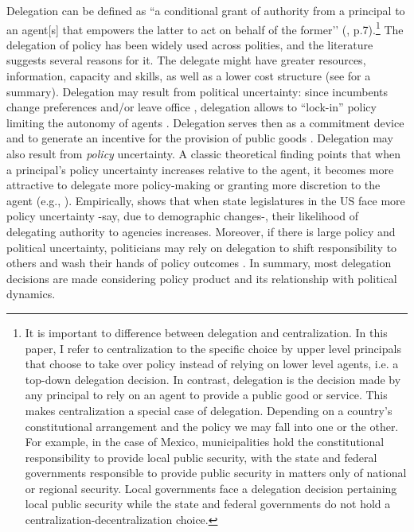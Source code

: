 \documentclass[12pt]{amsart}
\numberwithin{equation}{section}
\theoremstyle{definition}
\theoremstyle{definition}
\theoremstyle{definition}
\begin{document}

Delegation can be defined as ``a conditional grant of authority from a principal to an agent[s] that empowers the latter to act on behalf of the former’’ (\citet{Hawkins_etal_2006}, p.7).\footnote{It is important to difference between delegation and centralization. In this paper, I refer to centralization to the specific choice by upper level principals that choose to take over policy instead of relying on lower level agents, i.e. a top-down delegation decision. In contrast, delegation is the decision made by any principal to rely on an agent to provide a public good or service. This makes centralization a special case of delegation.  Depending on a country’s constitutional arrangement and the policy we may fall into one or the other. For example, in the case of Mexico, municipalities hold the constitutional responsibility to provide local public security, with the state and federal governments responsible to provide public security in matters only of national or regional security.  Local governments face a delegation decision pertaining local public security while the state and federal governments do not hold a centralization-decentralization choice.} The delegation of policy  has been widely used across polities, and the literature suggests several reasons for it. The delegate might have greater resources, information, capacity and skills, as well as a lower cost structure (see \citet{bolton_dewatripont_2005} for a summary). Delegation may result from political uncertainty: since incumbents change preferences and/or leave office \citep{moe_1989, shepsle_1992, horn_1995}, delegation  allows to ``lock-in'' policy limiting the autonomy of agents \citep{de_figueiredo_2002}.  Delegation serves then as a commitment device \citep{schelling_1960} and to generate an incentive for the provision of public goods \citep{aguion_tirole_1997}. Delegation may also result from \emph{policy} uncertainty. A classic theoretical finding points that when a principal's policy uncertainty increases relative to the agent, it becomes more attractive to delegate more policy-making or granting more discretion to the agent (e.g., \citet{epstein_halloran_1994, epstein_halloran_1999, bawn_1995}). Empirically, \citet{volden_2002} shows that when state legislatures in the US face more policy uncertainty -say, due to demographic changes-, their likelihood of delegating authority to agencies increases. Moreover, if there is large policy and political uncertainty, politicians may rely on delegation to shift responsibility to others and wash their hands of policy outcomes \citep{fiorina_1982, loftis_2014}. In summary, most delegation decisions are made considering policy product and its relationship with political dynamics.%
\end{document}

